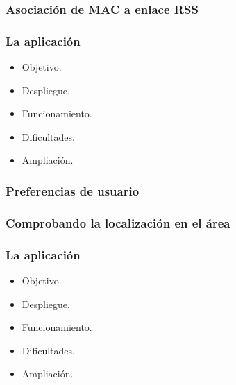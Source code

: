 
\begin{frame}
	\frametitle{Asociación de MAC a enlace RSS}
	
\end{frame}


\begin{frame}
	\frametitle{La aplicación \ULLAR{}}
		\begin{itemize}
			\item Objetivo.
			\item Despliegue.
			\item Funcionamiento.
			\item Dificultades.
			\item Ampliación.
		\end{itemize}
		\endblock{}
\end{frame}


\begin{frame}
	\frametitle{Preferencias de usuario}
	
\end{frame}


\begin{frame}
	\frametitle{Comprobando la localización en el área}
	
\end{frame}


\begin{frame}
	\frametitle{La aplicación \ULLAR{}}
		\begin{itemize}
			\item Objetivo.
			\item Despliegue.
			\item Funcionamiento.
			\item Dificultades.
			\item Ampliación.
		\end{itemize}
		\endblock{}
\end{frame}


